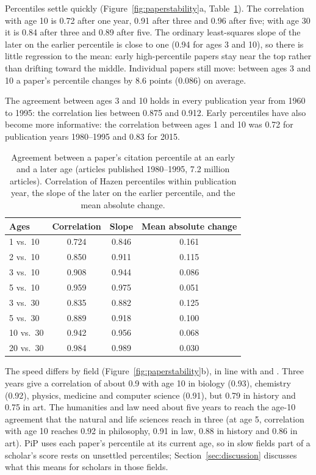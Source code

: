 \documentclass[11pt]{article}
\begin{document}
Percentiles settle quickly (Figure~\ref{fig:paperstability}a, Table~\ref{tab:paperstability}). The correlation with age
10 is 0.72 after one year, 0.91 after three and 0.96 after five; with age 30 it is 0.84 after three and 0.89 after five.
The ordinary least-squares slope of the later on the earlier percentile is close to one (0.94 for ages 3 and 10),
so there is little regression to the mean: early high-percentile papers stay near the top rather than drifting
toward the middle. Individual papers still move: between ages 3 and 10 a paper's percentile changes by 8.6
points (0.086) on average.

The agreement between ages 3 and 10 holds in every publication year from 1960 to 1995: the correlation lies between
0.875 and 0.912. Early percentiles have also become more informative: the correlation between ages 1 and 10 was 0.72
for publication years 1980--1995 and 0.83 for 2015.

\begin{table}[t]
  \centering
  \small
  \caption{Agreement between a paper's citation percentile at an early and a later age (articles published 1980--1995,
  7.2 million articles). Correlation of Hazen percentiles within publication year, the slope of the later on the earlier
  percentile, and the mean absolute change.}
  \label{tab:paperstability}
  \begin{tabular}{lccc}
    \toprule
    Ages & Correlation & Slope & Mean absolute change \\
    \midrule
    1 vs.\ 10 & 0.724 & 0.846 & 0.161 \\
    2 vs.\ 10 & 0.850 & 0.911 & 0.115 \\
    3 vs.\ 10 & 0.908 & 0.944 & 0.086 \\
    5 vs.\ 10 & 0.959 & 0.975 & 0.051 \\
    3 vs.\ 30 & 0.835 & 0.882 & 0.125 \\
    5 vs.\ 30 & 0.889 & 0.918 & 0.100 \\
    10 vs.\ 30 & 0.942 & 0.956 & 0.068 \\
    20 vs.\ 30 & 0.984 & 0.989 & 0.030 \\
    \bottomrule
  \end{tabular}
\end{table}

The speed differs by field (Figure~\ref{fig:paperstability}b), in line with \citet{wang2013window} and
\citet{abramo2011window}. Three years give a correlation of about 0.9 with age 10 in biology (0.93), chemistry (0.92),
physics, medicine and computer science (0.91), but 0.79 in history and 0.75 in art. The humanities and law need about
five years to reach the age-10 agreement that the natural and life sciences reach in three (at age 5, correlation with
age 10 reaches 0.92 in philosophy, 0.91 in law, 0.88 in history and 0.86 in art). PiP uses each paper's percentile at
its current age, so in slow fields part of a scholar's score rests on unsettled percentiles;
Section~\ref{sec:discussion} discusses what this means for scholars in those fields.
\end{document}
